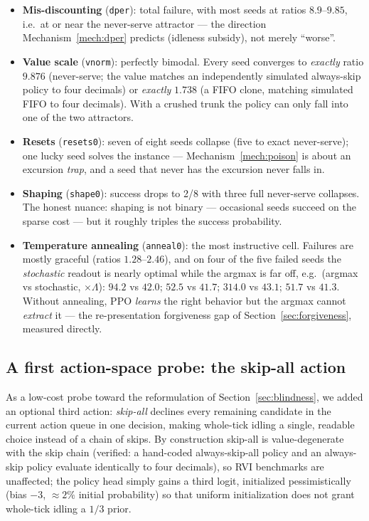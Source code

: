 \documentclass[11pt,a4paper]{article}
\begin{document}
\begin{itemize}
  \item \textbf{Mis-discounting} (\texttt{dper}): total failure, with
  most seeds at ratios $8.9$--$9.85$, i.e.\ at or near the never-serve
  attractor --- the direction Mechanism~\ref{mech:dper} predicts
  (idleness subsidy), not merely ``worse''.
  \item \textbf{Value scale} (\texttt{vnorm}): perfectly bimodal.  Every
  seed converges to \emph{exactly} ratio $9.876$ (never-serve; the value
  matches an independently simulated always-skip policy to four
  decimals) or \emph{exactly} $1.738$ (a FIFO clone, matching simulated
  FIFO to four decimals).  With a crushed trunk the policy can only fall
  into one of the two attractors.
  \item \textbf{Resets} (\texttt{resets0}): seven of eight seeds
  collapse (five to exact never-serve); one lucky seed solves the
  instance --- Mechanism~\ref{mech:poison} is about an excursion
  \emph{trap}, and a seed that never has the excursion never falls in.
  \item \textbf{Shaping} (\texttt{shape0}): success drops to 2/8 with
  three full never-serve collapses.  The honest nuance: shaping is not
  binary --- occasional seeds succeed on the sparse cost --- but it
  roughly triples the success probability.
  \item \textbf{Temperature annealing} (\texttt{anneal0}): the most
  instructive cell.  Failures are mostly graceful (ratios
  $1.28$--$2.46$), and on four of the five failed seeds the
  \emph{stochastic} readout is nearly optimal while the argmax is far
  off, e.g.\ (argmax vs stochastic, $\times\Lambda$):
  $94.2$ vs $42.0$;\; $52.5$ vs $41.7$;\; $314.0$ vs $43.1$;\;
  $51.7$ vs $41.3$.
  Without annealing, PPO \emph{learns} the right behavior but the
  argmax cannot \emph{extract} it --- the re-presentation forgiveness
  gap of Section~\ref{sec:forgiveness}, measured directly.
\end{itemize}

\subsection{A first action-space probe: the skip-all action}
\label{sec:skipall}

As a low-cost probe toward the reformulation of
Section~\ref{sec:blindness}, we added an optional third action:
\emph{skip-all} declines every remaining candidate in the current
action queue in one decision, making whole-tick idling a single,
readable choice instead of a chain of skips.  By construction skip-all
is value-degenerate with the skip chain (verified: a hand-coded
always-skip-all policy and an always-skip policy evaluate identically to
four decimals), so RVI benchmarks are unaffected; the policy head simply
gains a third logit, initialized pessimistically (bias $-3$,
${\approx}2\%$ initial probability) so that uniform initialization does
not grant whole-tick idling a $1/3$ prior.
\end{document}
